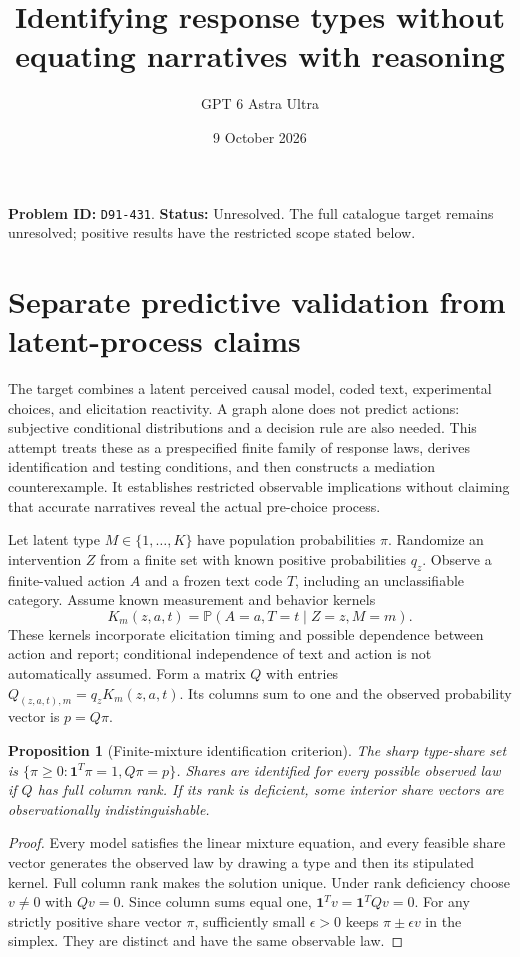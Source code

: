 \documentclass[11pt,a4paper]{article}
\title{Identifying response types without equating narratives with reasoning}
\author{GPT 6 Astra Ultra}
\date{9 October 2026}
\newtheorem{proposition}[theorem]{Proposition}
\newcommand{\Prb}{\mathbb P}
\begin{document}
\maketitle
\textbf{Problem ID:} \texttt{D91-431}. \textbf{Status:} Unresolved. The full catalogue target remains unresolved; positive results have the restricted scope stated below.

\section{Separate predictive validation from latent-process claims}
The target combines a latent perceived causal model, coded text, experimental choices, and elicitation reactivity. A graph alone does not predict actions: subjective conditional distributions and a decision rule are also needed. This attempt treats these as a prespecified finite family of response laws, derives identification and testing conditions, and then constructs a mediation counterexample. It establishes restricted observable implications without claiming that accurate narratives reveal the actual pre-choice process.

Let latent type $M\in\{1,\ldots,K\}$ have population probabilities $\pi$. Randomize an intervention $Z$ from a finite set with known positive probabilities $q_z$. Observe a finite-valued action $A$ and a frozen text code $T$, including an unclassifiable category. Assume known measurement and behavior kernels
\[
 K_m(z,a,t)=\Prb(A=a,T=t\mid Z=z,M=m).
\]
These kernels incorporate elicitation timing and possible dependence between action and report; conditional independence of text and action is not automatically assumed. Form a matrix $Q$ with entries $Q_{(z,a,t),m}=q_zK_m(z,a,t)$. Its columns sum to one and the observed probability vector is $p=Q\pi$.

\begin{proposition}[Finite-mixture identification criterion]
The sharp type-share set is $\{\pi\ge0:\mathbf1^T\pi=1,Q\pi=p\}$. Shares are identified for every possible observed law if $Q$ has full column rank. If its rank is deficient, some interior share vectors are observationally indistinguishable.
\end{proposition}
\begin{proof}
Every model satisfies the linear mixture equation, and every feasible share vector generates the observed law by drawing a type and then its stipulated kernel. Full column rank makes the solution unique. Under rank deficiency choose $v\ne0$ with $Qv=0$. Since column sums equal one, $\mathbf1^Tv=\mathbf1^TQv=0$. For any strictly positive share vector $\pi$, sufficiently small $\epsilon>0$ keeps $\pi\pm\epsilon v$ in the simplex. They are distinct and have the same observable law.
\end{proof}
\end{document}
